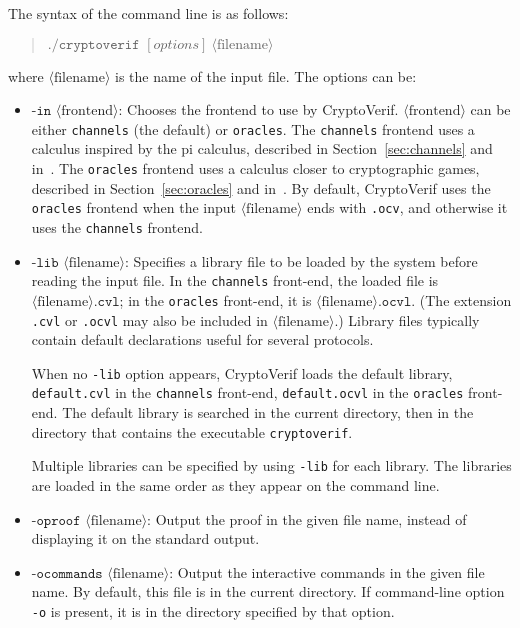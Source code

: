 \documentclass{article}
\newcommand{\nonterm}[1]{\langle\textrm{#1}\rangle}
\begin{document}
The syntax of the command line is as follows:
\begin{quote}
$\texttt{./cryptoverif }[options]\ \nonterm{filename}$
\end{quote}
where $\nonterm{filename}$ is the name of the input file.
The options can be:
\begin{itemize}

\item $\texttt{-in }\nonterm{frontend}$: Chooses the frontend to use
by CryptoVerif. $\nonterm{frontend}$ can be either \texttt{channels}
(the default) or \texttt{oracles}. The \texttt{channels} frontend
uses a calculus inspired by the pi calculus, described 
in Section~\ref{sec:channels} and in~\cite{Blanchet06,BlanchetEPrint05}.
The \texttt{oracles} frontend uses a calculus closer to cryptographic
games, described in Section~\ref{sec:oracles} and 
in~\cite{Blanchet06b,BlanchetPointchevalEPrint06}.
By default, CryptoVerif uses the \texttt{oracles} frontend when the input
$\nonterm{filename}$ ends with \texttt{.ocv}, and otherwise it uses the
\texttt{channels} frontend.

\item $\texttt{-lib }\nonterm{filename}$: Specifies a library
  file to be loaded by the system
  before reading the input file. In the \texttt{channels} front-end,
  the loaded file is $\nonterm{filename}\texttt{.cvl}$; in the
  \texttt{oracles} front-end, it is
  $\nonterm{filename}\texttt{.ocvl}$. (The extension \texttt{.cvl}
  or \texttt{.ocvl} may also be included in $\nonterm{filename}$.)
  Library files typically contain default declarations useful for several
  protocols.
  
  When no \texttt{-lib} option appears, CryptoVerif loads the
  default library, \texttt{default.cvl} in the \texttt{channels} front-end,
  \texttt{default.ocvl} in the \texttt{oracles} front-end.
  The default library is searched in the current directory, then
  in the directory that contains the executable \texttt{cryptoverif}.

  Multiple libraries can be specified by using \texttt{-lib} for each library.
  The libraries are loaded in the same order as they appear on the command line.
  
\item $\texttt{-oproof }\nonterm{filename}$: Output the proof
in the given file name, instead of displaying it on the standard output.

\item $\texttt{-ocommands }\nonterm{filename}$: Output the interactive commands
  in the given file name. By default, this file is in the current directory.
  If command-line option \texttt{-o} is present, it is in the directory
  specified by that option.


\end{itemize}
\end{document}
